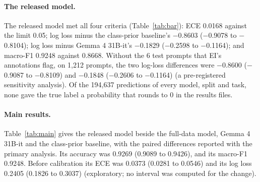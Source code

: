 \documentclass[11pt,letterpaper]{article}
\begin{document}
\paragraph{The released model.} The released model met all four criteria (Table~\ref{tab:bar}): ECE 0.0168 against the limit 0.05; log loss minus the class-prior baseline's $-$0.8603 ($-$0.9078 to $-$0.8104); log loss minus Gemma 4 31B-it's $-$0.1829 ($-$0.2598 to $-$0.1164); and macro-F1 0.9248 against 0.8668. Without the 6 test prompts that EI's annotations flag, on 1,212 prompts, the two log-loss differences were $-$0.8600 ($-$0.9087 to $-$0.8109) and $-$0.1848 ($-$0.2606 to $-$0.1164) (a pre-registered sensitivity analysis). Of the 194,637 predictions of every model, split and task, none gave the true label a probability that rounds to 0 in the results files.

\begin{table}[t]
\centering\small
\caption{The four pre-registered criteria on Evidence Inference 2.0's test split (1,218 prompts in 333 articles), for the full-data model as registered and for the released model as the amendment fixed them. ECE is the expected calibration error. Criteria 2 and 3 give the difference in log loss with its 95 percent interval from 10,000 article resamples; Gemma 4 31B-it is calibrated on validation and reads the same input as each model (4,096 tokens for the full-data model, 6,144 for the released model).}
\label{tab:bar}

\end{table}

\paragraph{Main results.} Table~\ref{tab:main} gives the released model beside the full-data model, Gemma 4 31B-it and the class-prior baseline, with the paired differences reported with the primary analysis. Its accuracy was 0.9269 (0.9089 to 0.9426), and its macro-F1 0.9248. Before calibration its ECE was 0.0373 (0.0281 to 0.0546) and its log loss 0.2405 (0.1826 to 0.3037) (exploratory; no interval was computed for the change).

\begin{table}[t]
\centering\footnotesize
\caption{Evidence Inference 2.0, test split (1,218 prompts in 333 articles), each model calibrated on validation. Each cell gives the estimate and its 95 percent interval from 1,000 article resamples. ECE is the expected calibration error, whose percentile interval can lie above its estimate, since the ECE is biased upward in resamples; the Brier score is summed over the three answers. Gemma 4 31B-it reads the same 6,144-token input as the released model; the full-data model's results are on its own 4,096-token input. The class prior gives every prompt the training split's label distribution. The last two rows give the paired differences reported with the primary analysis, the released model minus each reference on the same resamples; the criteria themselves are decided by Table~\ref{tab:bar}'s intervals, from 10,000 resamples. \textsuperscript{\dag}No difference was detected: the interval includes zero.}
\label{tab:main}
\setlength{\tabcolsep}{3.5pt}

\end{table}
\end{document}
